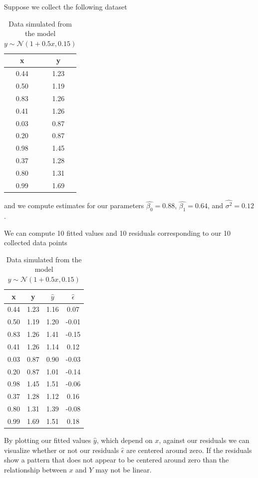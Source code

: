 \ex Suppose we collect the following dataset 
\begin{table}[ht!]
    \centering
    \begin{tabular}{c|c}
        x & y    \\
        \hline
     0.44 & 1.23 \\
     0.50 & 1.19 \\
     0.83 & 1.26 \\ 
     0.41 & 1.26 \\
     0.03 & 0.87 \\
     0.20 & 0.87 \\
     0.98 & 1.45 \\
     0.37 & 1.28 \\
     0.80 & 1.31 \\
     0.99 & 1.69 \\
    \end{tabular}
    \caption{Data simulated from the model $y \sim \mathcal{N}(1+0.5x, 0.15)$\label{tab.diag}}
\end{table}
and we compute estimates for our parameters $\hat{\beta_{0}} = 0.88$, $\hat{\beta_{1}} = 0.64$, and $\hat{\sigma^{2}} = 0.12$.

We can compute 10 fitted values and 10 residuals corresponding to our 10 collected data points
\begin{table}[ht!]
    \centering
    \begin{tabular}{c|c|c|c}
        x & y & $\hat{y}$ & $\hat{\epsilon}$    \\
        \hline
     0.44 & 1.23 & 1.16 & 0.07 \\
     0.50 & 1.19 & 1.20 & -0.01\\
     0.83 & 1.26 & 1.41 & -0.15\\ 
     0.41 & 1.26 & 1.14 & 0.12 \\
     0.03 & 0.87 & 0.90 & -0.03\\
     0.20 & 0.87 & 1.01 & -0.14\\
     0.98 & 1.45 & 1.51 & -0.06\\
     0.37 & 1.28 & 1.12 & 0.16\\
     0.80 & 1.31 & 1.39 & -0.08\\
     0.99 & 1.69 & 1.51 & 0.18\\
    \end{tabular}
    \caption{Data simulated from the model $y \sim \mathcal{N}(1+0.5x, 0.15)$\label{tab.diag}}
\end{table}

By plotting our fitted values $\hat{y}$, which depend on $x$, against our residuals we can visualize whether or not our residuals $\hat{\epsilon}$ are centered around zero. 
If the residuals show a pattern that does not appear to be centered around zero than the relationship between $x$ and $Y$ may not be linear.

